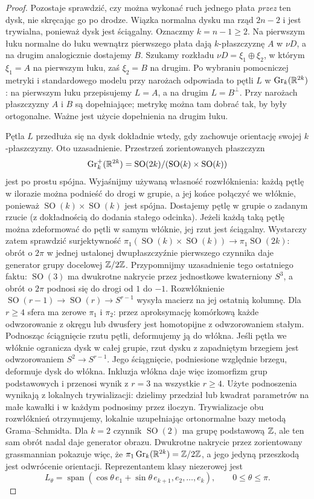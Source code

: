 \begin{proof}
Pozostaje sprawdzić, czy można wykonać
ruch jednego płata \emph{przez} ten dysk,
nie skręcając go po drodze. Wiązka
normalna dysku ma rząd $2n-2$ i jest
trywialna, ponieważ dysk jest ściągalny.
Oznaczmy $k=n-1\geq2$. Na pierwszym łuku normalne
do łuku wewnątrz pierwszego płata dają $k$-płaszczyznę
$A$ w $\nu D$, a na drugim analogicznie dostajemy $B$.
Szukamy rozkładu $\nu D=\xi_1\oplus\xi_2$, w którym
$\xi_1=A$ na pierwszym łuku, zaś $\xi_2=B$ na drugim.
Po wybraniu pomocniczej metryki i standardowego modelu
przy narożach odpowiada to pętli $L$ w
$\operatorname{Gr}_k(\mathbb{R}^{2k})$: na pierwszym łuku
przepisujemy $L=A$, a na drugim $L=B^\perp$.
Przy narożach płaszczyzny $A$ i $B$ są dopełniające;
metrykę można tam dobrać tak, by były ortogonalne.
Ważne jest użycie dopełnienia na drugim łuku.

Pętla $L$ przedłuża się na dysk dokładnie wtedy,
gdy zachowuje orientację swojej $k$-płaszczyzny.
Oto uzasadnienie. Przestrzeń zorientowanych płaszczyzn
\[
 \operatorname{Gr}^+_k(\mathbb{R}^{2k})
 =\operatorname{SO}(2k)/(\operatorname{SO}(k)\times
                         \operatorname{SO}(k))
\]
jest po prostu spójna. Wyjaśnijmy używaną własność
rozwłóknienia: każdą pętlę w ilorazie można podnieść do
drogi w grupie, a jej końce połączyć we włóknie,
ponieważ $\operatorname{SO}(k)\times\operatorname{SO}(k)$
jest spójna. Dostajemy pętlę w grupie o zadanym rzucie
(z dokładnością do dodania stałego odcinka).
Jeżeli każdą taką pętlę można zdeformować do pętli
w samym włóknie, jej rzut jest ściągalny.
Wystarczy zatem sprawdzić surjektywność
$\pi_1(\operatorname{SO}(k)\times\operatorname{SO}(k))
\to\pi_1\operatorname{SO}(2k)$: obrót o $2\pi$
w jednej ustalonej dwupłaszczyźnie pierwszego czynnika
daje generator grupy docelowej $\mathbb{Z}/2\mathbb{Z}$.
Przypomnijmy uzasadnienie tego ostatniego faktu:
$\operatorname{SO}(3)$ ma dwukrotne nakrycie przez
jednostkowe kwaterniony $S^3$, a obrót o $2\pi$
podnosi się do drogi od $1$ do $-1$.
Rozwłóknienie $\operatorname{SO}(r-1)\to\operatorname{SO}(r)
\to S^{r-1}$ wysyła macierz na jej ostatnią kolumnę.
Dla $r\geq4$ sfera ma zerowe $\pi_1$ i $\pi_2$:
przez aproksymację komórkową każde odwzorowanie z okręgu
lub dwusfery jest homotopijne z odwzorowaniem stałym.
Podnosząc ściągnięcie rzutu pętli, deformujemy ją
do włókna. Jeśli pętla we włóknie ogranicza dysk
w całej grupie, rzut dysku z zapadniętym brzegiem
jest odwzorowaniem $S^2\to S^{r-1}$. Jego ściągnięcie, podniesione
względnie brzegu, deformuje dysk do włókna.
Inkluzja włókna daje więc izomorfizm grup podstawowych
i przenosi wynik z $r=3$ na wszystkie $r\geq4$.
Użyte podnoszenia wynikają z lokalnych trywializacji:
dzielimy przedział lub kwadrat parametrów na małe
kawałki i w każdym podnosimy przez iloczyn.
Trywializacje obu rozwłóknień otrzymujemy, lokalnie
uzupełniając ortonormalne bazy metodą Grama--Schmidta.
Dla $k=2$ czynnik
$\operatorname{SO}(2)$ ma grupę podstawową $\mathbb{Z}$,
ale ten sam obrót nadal daje generator obrazu.
Dwukrotne nakrycie przez zorientowany grassmannian
pokazuje więc, że $\pi_1\operatorname{Gr}_k(\mathbb{R}^{2k})
=\mathbb{Z}/2\mathbb{Z}$, a jego jedyną przeszkodą jest odwrócenie
orientacji. Reprezentantem klasy niezerowej jest
\[
 L_\theta=\operatorname{span}
 (\cos\theta\,e_1+\sin\theta\,e_{k+1},e_2,\ldots,e_k),
 \qquad 0\leq\theta\leq\pi.
\]


\end{proof}
